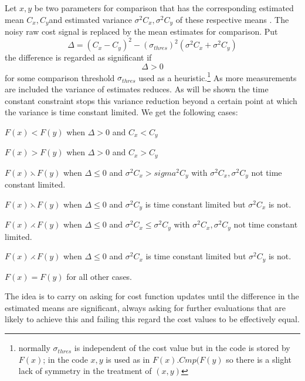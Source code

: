 \documentclass[a4paper,oneside,english]{book}
\numberwithin{equation}{section}
\numberwithin{figure}{section}
\begin{document}
Let $x,y $   be two parameters  for comparison that has the corresponding estimated mean $C_x,C_y $and estimated  variance $\sigma^2C_x, \sigma^2C_y$ of these respective means .  The noisy raw cost signal is replaced by the mean estimates for comparison. Put
\[ \Delta=(C_x-C_y)^2 -(\sigma_{thres})^2(\sigma^2C_x+\sigma^2C_y) \]
the difference is regarded as significant if 
\[  \Delta>0\]
for some comparison threshold $\sigma_{thres} $ used as a heuristic.\footnote{ normally $ \sigma_{thres}$ is independent of the cost value but in the code is stored by $F(x)$; in the code $x,y$ is used as in $F(x).Cmp(F(y) $ so there is a slight lack of symmetry in the treatment of $(x,y)$  } As more measurements are included the variance of estimates reduces. As will be shown the time constant constraint stops this variance reduction beyond a certain point at which  the  variance is time constant limited. We get the following cases:
\begin{list}{}
	\item $F(x)<F(y)$  when $\Delta >0$ and $C_x<C_y$
	\item $F(x)>F(y)$  when $\Delta >0$ and $C_x>C_y$	
	\item $F(x) \leftthreetimes F(y)$  when $\Delta \le 0$  and $\sigma ^2C_x>sigma^2C_y$ with $\sigma ^2C_x,\sigma ^2C_y$ not time constant limited.
	\item $F(x) \leftthreetimes F(y)$  when $\Delta \le 0$  and $\sigma ^2C_y$ is time constant limited but $\sigma ^2C_x$ is not.
	\item $F(x) \rightthreetimes F(y)$   when $\Delta \le 0$  and $\sigma ^2C_x \le \sigma^2C_y$ with $\sigma ^2C_x,\sigma ^2C_y$ not time constant limited.
	\item $F(x) \rightthreetimes F(y)$ when $\Delta \le 0$  and $\sigma ^2C_x$ is time constant limited but $\sigma ^2C_y$ is not.
	\item $F(x)=F(y)$    for all other cases.			
\end{list} 
The idea is to carry on asking for cost function updates until the difference in the estimated means are significant, always asking for further evaluations that are likely to achieve this and failing this regard the  cost values to be effectively equal. 
\end{document}
